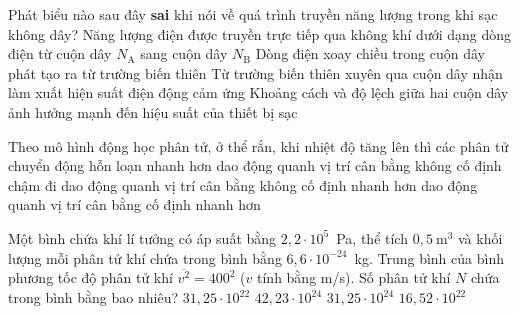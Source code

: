 \begin{ex}
\begin{center}
		\end{center}
		Phát biểu nào sau đây \textbf{sai} khi nói về quá trình truyền năng lượng trong khi sạc không dây?
		\choice
		{\True Năng lượng điện được truyền trực tiếp qua không khí dưới dạng dòng điện từ cuộn dây $N_\text{A}$ sang cuộn dây $N_\text{B}$}
		{Dòng điện xoay chiều trong cuộn dây phát tạo ra từ trường biến thiên}
		{Từ trường biến thiên xuyên qua cuộn dây nhận làm xuất hiện suất điện động cảm ứng}
		{Khoảng cách và độ lệch giữa hai cuộn dây ảnh hưởng mạnh đến hiệu suất của thiết bị sạc}
	\end{ex}

	\begin{ex}%
		Theo mô hình động học phân tử, ở thể rắn, khi nhiệt độ tăng lên thì các phân tử
		\choice
		{chuyển động hỗn loạn nhanh hơn}
		{dao động quanh vị trí cân bằng không cố định chậm đi}
		{dao động quanh vị trí cân bằng không cố định nhanh hơn}
		{\True dao động quanh vị trí cân bằng cố định nhanh hơn}
	\end{ex}

	\begin{ex}%
		Một bình chứa khí lí tưởng có áp suất bằng $2{,}2\cdot 10^5$~Pa, thể tích $0{,}5~\text{m}^3$ và khối lượng mỗi phân tử khí chứa trong bình bằng $6{,}6\cdot 10^{-24}$~kg. Trung bình của bình phương tốc độ phân tử khí $\overline{v^2}=400^2$ ($v$ tính bằng m/s). Số phân tử khí $N$ chứa trong bình bằng bao nhiêu?
		\choice
		{\True $31{,}25\cdot 10^{22}$}
		{$42{,}23\cdot 10^{24}$}
		{$31{,}25\cdot 10^{24}$}
		{$16{,}52\cdot 10^{22}$}
	\end{ex}

